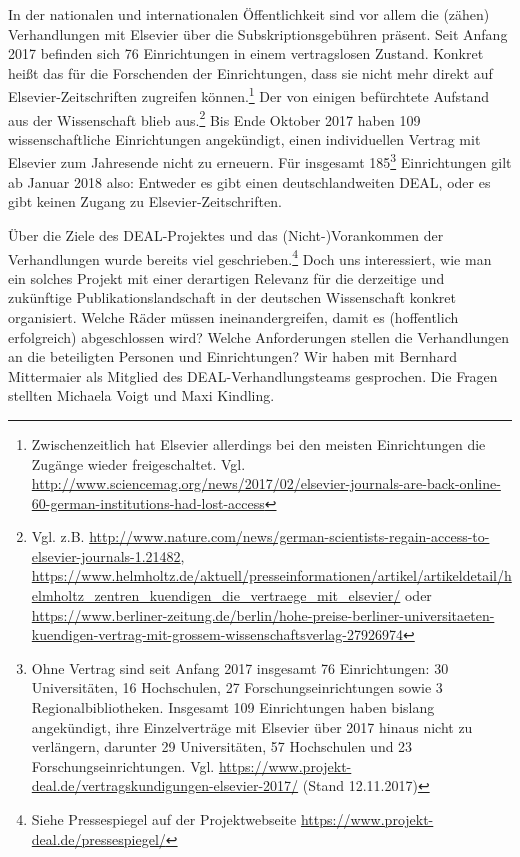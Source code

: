 \documentclass[a4paper,
fontsize=11pt,
oneside,
numbers=noperiodatend,
parskip=half-,
bibliography=totoc,
final
]{scrartcl}
\begin{document}
In der nationalen und internationalen Öffentlichkeit sind vor allem die
(zähen) Verhandlungen mit Elsevier über die Subskriptionsgebühren
präsent. Seit Anfang 2017 befinden sich 76 Einrichtungen in einem
vertragslosen Zustand. Konkret heißt das für die Forschenden der
Einrichtungen, dass sie nicht mehr direkt auf Elsevier-Zeitschriften
zugreifen können.\footnote{Zwischenzeitlich hat Elsevier allerdings bei
  den meisten Einrichtungen die Zugänge wieder freigeschaltet. Vgl.
  \url{http://www.sciencemag.org/news/2017/02/elsevier-journals-are-back-online-60-german-institutions-had-lost-access}}
Der von einigen befürchtete Aufstand aus der Wissenschaft blieb
aus.\footnote{Vgl. z.B.
  \url{http://www.nature.com/news/german-scientists-regain-access-to-elsevier-journals-1.21482},
  \url{https://www.helmholtz.de/aktuell/presseinformationen/artikel/artikeldetail/helmholtz_zentren_kuendigen_die_vertraege_mit_elsevier/}
  oder
  \url{https://www.berliner-zeitung.de/berlin/hohe-preise-berliner-universitaeten-kuendigen-vertrag-mit-grossem-wissenschaftsverlag-27926974}}
Bis Ende Oktober 2017 haben 109 wissenschaftliche Einrichtungen
angekündigt, einen individuellen Vertrag mit Elsevier zum Jahresende
nicht zu erneuern. Für insgesamt 185\footnote{Ohne Vertrag sind seit
  Anfang 2017 insgesamt 76 Einrichtungen: 30 Universitäten, 16
  Hochschulen, 27 Forschungseinrichtungen sowie 3 Regionalbibliotheken.
  Insgesamt 109 Einrichtungen haben bislang angekündigt, ihre
  Einzelverträge mit Elsevier über 2017 hinaus nicht zu verlängern,
  darunter 29 Universitäten, 57 Hochschulen und 23
  Forschungseinrichtungen. Vgl.
  \url{https://www.projekt-deal.de/vertragskundigungen-elsevier-2017/}
  (Stand 12.11.2017)} Einrichtungen gilt ab Januar 2018 also: Entweder
es gibt einen deutschlandweiten DEAL, oder es gibt keinen Zugang zu
Elsevier-Zeitschriften.

Über die Ziele des DEAL-Projektes und das (Nicht-)Vorankommen der
Verhandlungen wurde bereits viel geschrieben.\footnote{Siehe
  Pressespiegel auf der Projektwebseite
  \url{https://www.projekt-deal.de/pressespiegel/}} Doch uns
interessiert, wie man ein solches Projekt mit einer derartigen Relevanz
für die derzeitige und zukünftige Publikationslandschaft in der
deutschen Wissenschaft konkret organisiert. Welche Räder müssen
ineinandergreifen, damit es (hoffentlich erfolgreich) abgeschlossen
wird? Welche Anforderungen stellen die Verhandlungen an die beteiligten
Personen und Einrichtungen? Wir haben mit Bernhard Mittermaier als
Mitglied des DEAL-Verhandlungsteams gesprochen. Die Fragen stellten
Michaela Voigt und Maxi Kindling.
\end{document}
